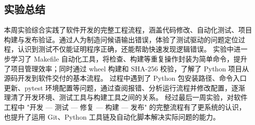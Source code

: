 \documentclass[UTF8,a4paper,11pt]{ctexart}
\begin{document}
\subsection{实验总结}

本周实验综合实践了软件开发的完整工程流程，涵盖代码修改、自动化测试、项目构建与发布验证。通过人为制造问候语输出错误，体验了测试驱动的问题定位过程，认识到测试不仅能证明程序正确，还能帮助快速发现逻辑错误。
实验中进一步学习了 Makefile 自动化工具，将检查、构建等重复操作封装为简单命令，提升了项目管理效率；同时通过 wheel 构建和 SHA-256 校验，了解了 Python 项目从源码开发到软件交付的基本流程。
过程中遇到了 Python 包安装路径、命令入口更新、pytest 环境配置等问题，通过查阅报错、分析运行流程并修改配置，逐渐理清了开发环境、测试工具与构建工具之间的关系。
经过最后一周实验，对软件工程中 "开发 — 测试 — 修复 — 构建 — 发布" 的完整流程有了更系统的认识，也提升了运用 Git、Python 工具链及自动化脚本解决实际问题的能力。
\end{document}
